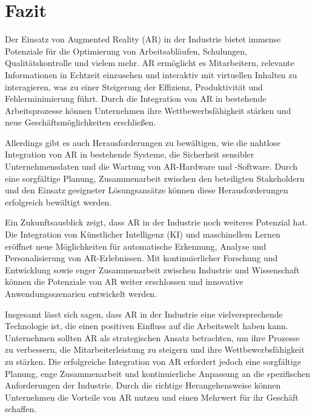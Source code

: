 \section{Fazit}
Der Einsatz von Augmented Reality (AR) in der Industrie bietet immense
Potenziale für die Optimierung von Arbeitsabläufen, Schulungen,
Qualitätskontrolle und vielem mehr. AR ermöglicht es Mitarbeitern, relevante
Informationen in Echtzeit einzusehen und interaktiv mit virtuellen Inhalten zu
interagieren, was zu einer Steigerung der Effizienz, Produktivität und
Fehlerminimierung führt. Durch die Integration von AR in bestehende
Arbeitsprozesse können Unternehmen ihre Wettbewerbsfähigkeit stärken und neue
Geschäftsmöglichkeiten erschließen.

Allerdings gibt es auch Herausforderungen zu bewältigen, wie die nahtlose
Integration von AR in bestehende Systeme, die Sicherheit sensibler
Unternehmensdaten und die Wartung von AR-Hardware und -Software. Durch eine
sorgfältige Planung, Zusammenarbeit zwischen den beteiligten Stakeholdern und
den Einsatz geeigneter Lösungsansätze können diese Herausforderungen
erfolgreich bewältigt werden.

Ein Zukunftsausblick zeigt, dass AR in der Industrie noch weiteres Potenzial
hat. Die Integration von Künstlicher Intelligenz (KI) und maschinellem Lernen
eröffnet neue Möglichkeiten für automatische Erkennung, Analyse und
Personalisierung von AR-Erlebnissen. Mit kontinuierlicher Forschung und
Entwicklung sowie enger Zusammenarbeit zwischen Industrie und Wissenschaft
können die Potenziale von AR weiter erschlossen und innovative
Anwendungsszenarien entwickelt werden.

Insgesamt lässt sich sagen, dass AR in der Industrie eine vielversprechende
Technologie ist, die einen positiven Einfluss auf die Arbeitswelt haben kann.
Unternehmen sollten AR als strategischen Ansatz betrachten, um ihre Prozesse zu
verbessern, die Mitarbeiterleistung zu steigern und ihre Wettbewerbsfähigkeit
zu stärken. Die erfolgreiche Integration von AR erfordert jedoch eine
sorgfältige Planung, enge Zusammenarbeit und kontinuierliche Anpassung an die
spezifischen Anforderungen der Industrie. Durch die richtige Herangehensweise
können Unternehmen die Vorteile von AR nutzen und einen Mehrwert für ihr
Geschäft schaffen.